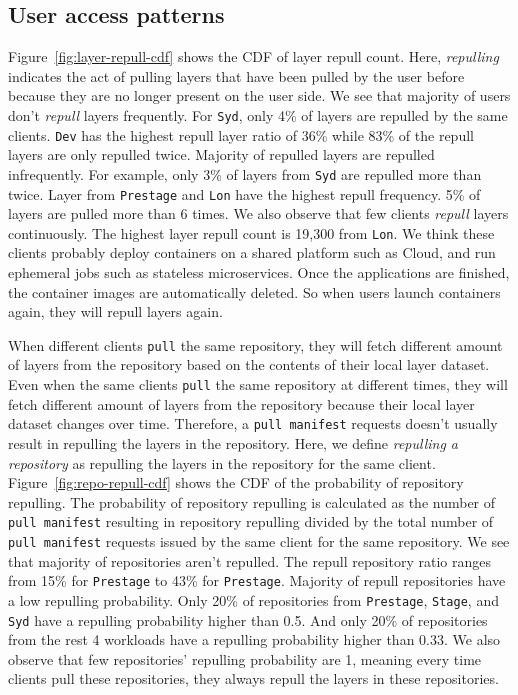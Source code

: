 \subsection{User access patterns}


Figure~\ref{fig:layer-repull-cdf} shows the CDF of layer repull count. Here, \emph{repulling} indicates the act of pulling layers that have been pulled by the user before because they are no longer present on the user side.
We see that majority of users don't \emph{repull} layers frequently.
For \texttt{Syd}, only 4\% of layers are repulled by the same clients.
\texttt{Dev} has the highest repull layer ratio of 36\% while 83\% of the repull layers are only repulled twice.
Majority of repulled layers are repulled infrequently.
For example, only 3\% of layers from \texttt{Syd} are repulled more than twice.
Layer from \texttt{Prestage} and \texttt{Lon} have the highest repull frequency.
5\% of layers are pulled more than 6 times.
We also observe that few clients \emph{repull} layers continuously.
The highest layer repull count is 19,300 from \texttt{Lon}.
We think these clients probably deploy containers on a shared platform such as Cloud,
and run ephemeral jobs such as stateless microservices. 
Once the applications are finished, the container images are automatically deleted.
So when users launch containers again, they will repull layers again.

When different clients \texttt{pull} the same repository, 
they will fetch different amount of layers from the repository based on the contents of their local layer dataset.
Even when the same clients \texttt{pull} the same repository at different times, 
they will fetch different amount of layers from the repository because their local layer dataset changes over time.
Therefore, a \texttt{pull manifest} requests doesn't usually result in repulling the layers in the repository. 
Here, we define \emph{repulling a repository} as repulling the layers in the repository for the same client.
Figure~\ref{fig:repo-repull-cdf} shows the CDF of the probability of repository repulling.
The probability of repository repulling is calculated 
as the number of \texttt{pull manifest} resulting in repository repulling divided by 
the total number of \texttt{pull manifest} requests issued by the same client for the same repository.
We see that majority of repositories aren't repulled.
The repull repository ratio ranges from 15\% for \texttt{Prestage} to 43\% for \texttt{Prestage}.
Majority of repull repositories have a low repulling probability.
Only 20\% of repositories from  \texttt{Prestage}, \texttt{Stage}, and 
\texttt{Syd} have a repulling probability higher than 0.5.
And only 20\% of repositories from the rest 4 workloads have a repulling probability higher than 0.33.
We also observe that few repositories' repulling probability are 1, meaning 
every time clients pull these repositories, they always repull the layers in these repositories. 
 
